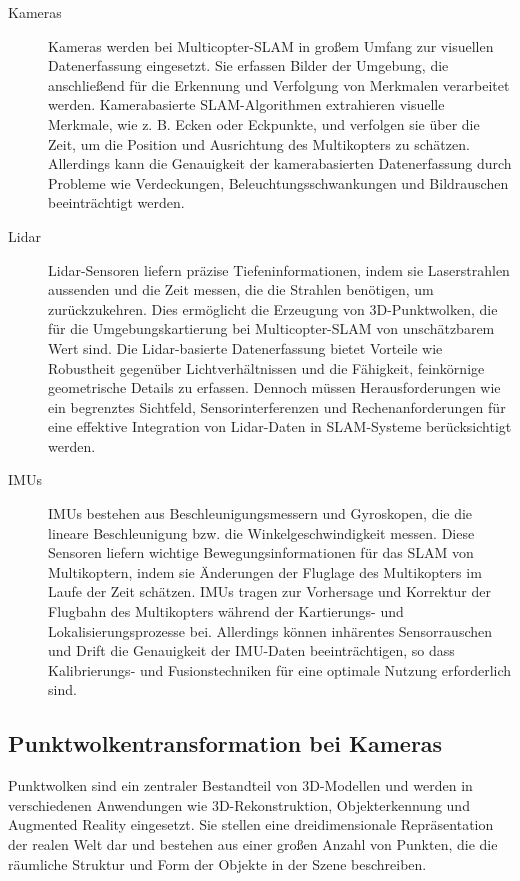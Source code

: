 \begin{description}
    \item[Kameras] Kameras werden bei Multicopter-SLAM in großem Umfang zur visuellen Datenerfassung eingesetzt. Sie erfassen Bilder der Umgebung, die anschließend für die Erkennung und Verfolgung von Merkmalen verarbeitet werden. Kamerabasierte SLAM-Algorithmen extrahieren visuelle Merkmale, wie z. B. Ecken oder Eckpunkte, und verfolgen sie über die Zeit, um die Position und Ausrichtung des Multikopters zu schätzen. Allerdings kann die Genauigkeit der kamerabasierten Datenerfassung durch Probleme wie Verdeckungen, Beleuchtungsschwankungen und Bildrauschen beeinträchtigt werden.
    \item[Lidar]Lidar-Sensoren liefern präzise Tiefeninformationen, indem sie Laserstrahlen aussenden und die Zeit messen, die die Strahlen benötigen, um zurückzukehren. Dies ermöglicht die Erzeugung von 3D-Punktwolken, die für die Umgebungskartierung bei Multicopter-SLAM von unschätzbarem Wert sind. Die Lidar-basierte Datenerfassung bietet Vorteile wie Robustheit gegenüber Lichtverhältnissen und die Fähigkeit, feinkörnige geometrische Details zu erfassen. Dennoch müssen Herausforderungen wie ein begrenztes Sichtfeld, Sensorinterferenzen und Rechenanforderungen für eine effektive Integration von Lidar-Daten in SLAM-Systeme berücksichtigt werden.
    \item[IMUs]IMUs bestehen aus Beschleunigungsmessern und Gyroskopen, die die lineare Beschleunigung bzw. die Winkelgeschwindigkeit messen. Diese Sensoren liefern wichtige Bewegungsinformationen für das SLAM von Multikoptern, indem sie Änderungen der Fluglage des Multikopters im Laufe der Zeit schätzen. IMUs tragen zur Vorhersage und Korrektur der Flugbahn des Multikopters während der Kartierungs- und Lokalisierungsprozesse bei. Allerdings können inhärentes Sensorrauschen und Drift die Genauigkeit der IMU-Daten beeinträchtigen, so dass Kalibrierungs- und Fusionstechniken für eine optimale Nutzung erforderlich sind.  
\end{description}




\subsection{Punktwolkentransformation bei Kameras}

Punktwolken sind ein zentraler Bestandteil von 3D-Modellen und werden in verschiedenen Anwendungen wie 3D-Rekonstruktion, Objekterkennung und Augmented Reality eingesetzt. Sie stellen eine dreidimensionale Repräsentation der realen Welt dar und bestehen aus einer großen Anzahl von Punkten, die die räumliche Struktur und Form der Objekte in der Szene beschreiben.


